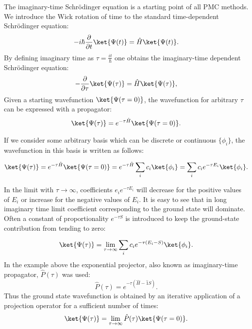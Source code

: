 \documentclass[twoside,english]{uiofysmaster}
\begin{document}
The imaginary-time Schr\"{o}dinger equation is a starting point of all PMC methods. We introduce the Wick rotation of time to the standard time-dependent Schr\"{o}dinger equation:
\begin{equation}
-i\hbar \frac{\partial}{\partial t} \ket{\Psi(t)}= \hat{H} \ket{\Psi(t)}.
\end{equation}
By defining imaginary time as $\tau = \frac{it}{\hbar}$ one obtains the imaginary-time dependent Schr\"{o}dinger equation:
\begin{equation}\label{ITSE}
-\frac{\partial}{\partial \tau} \ket{\Psi(\tau)}= \hat{H} \ket{\Psi(\tau)},
\end{equation}
Given a starting wavefunction $\ket{\Psi(\tau = 0)}$, the wavefunction for arbitrary $\tau$ can be expressed with a propagator:
\begin{equation}\label{SEsolutionpropagator}
\ket{\Psi(\tau)}= e^{-\tau \hat{H}}\ket{\Psi(\tau = 0)}.
\end{equation}

If we consider some arbitrary basis which can be discrete or continuous $\{\phi_i\}$, the wavefunction in this basis is written as follows:

\begin{equation}
\ket{\Psi(\tau)}= e^{-\tau \hat{H}}\ket{\Psi(\tau = 0)} = e^{-\tau \hat{H}}\sum_i c_i \ket{\phi_i} = \sum_i c_i e^{-\tau E_i} \ket{\phi_i}. 
\end{equation}

In the limit with $\tau \rightarrow \infty$, coefficients $ e_i
e^{-\tau E_i}$ will decrease for the positive values of $E_i$ or
increase for the negative values of $E_i$. It is easy to see that in
long imaginary time limit coefficient corresponding to the ground
state will dominate. Often a constant of proportionality $e^{-\tau S}$
is introduced to keep the ground-state contribution from tending to
zero:

\[
\ket{\Psi(\tau)}= \lim_{\tau\to\infty} \sum_i c_i e^{-\tau (E_i - S)} \ket{\phi_i}. 
\]
In the example above the exponential projector, also known as imaginary-time propagator, $\hat{P}(\tau)$ was used:
\[
\hat{P}(\tau)= e^{-\tau (\hat{H} - \hat{1}S)} .
\]
Thus the ground state wavefunction is obtained by an iterative application of a projection operator for a sufficient number of times: 
\begin{equation}\label{MCPMC}
\ket{\Psi(\tau)}= \lim_{\tau\to\infty} \hat{P}(\tau) \ket{\Psi(\tau = 0)}. 
\end{equation}
\end{document}
